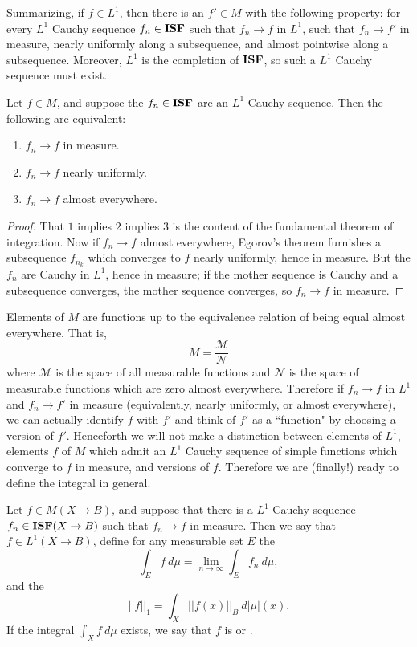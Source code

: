 \begin{subsec}
Summarizing, if $f \in L^1$, then there is an $f' \in M$ with the following property: for every $L^1$ Cauchy sequence $f_n \in \mathbf{ISF}$ such that $f_n \to f$ in $L^1$, such that $f_n \to f'$ in measure, nearly uniformly along a subsequence, and almost pointwise along a subsequence.
Moreover, $L^1$ is the completion of $\mathbf{ISF}$, so such a $L^1$ Cauchy sequence must exist.
\end{subsec}

\begin{corollary}
Let $f \in M$, and suppose the $f_n \in \mathbf{ISF}$ are an $L^1$ Cauchy sequence. Then the following are equivalent:
\begin{enumerate}
\item $f_n \to f$ in measure.
\item $f_n \to f$ nearly uniformly.
\item $f_n \to f$ almost everywhere.
\end{enumerate}
\end{corollary}
\begin{proof}
That $1$ implies $2$ implies $3$ is the content of the fundamental theorem of integration.
Now if $f_n \to f$ almost everywhere, Egorov's theorem furnishes a subsequence $f_{n_k}$ which converges to $f$ nearly uniformly, hence in measure.
But the $f_n$ are Cauchy in $L^1$, hence in measure; if the mother sequence is Cauchy and a subsequence converges, the mother sequence converges, so $f_n \to f$ in measure.
\end{proof}

\begin{subsec}
Elements of $M$ are functions up to the equivalence relation of being equal almost everywhere.
That is,
$$M = \frac{\mathcal M}{\mathcal N}$$
where $\mathcal M$ is the space of all measurable functions and $\mathcal N$ is the space of measurable functions which are zero almost everywhere.
Therefore if $f_n \to f$ in $L^1$ and $f_n \to f'$ in measure (equivalently, nearly uniformly, or almost everywhere), we can actually identify $f$ with $f'$ and think of $f'$ as a ``function" by choosing a version of $f'$.
Henceforth we will not make a distinction between elements of $L^1$, elements $f$ of $M$ which admit an $L^1$ Cauchy sequence of simple functions which converge to $f$ in measure, and versions of $f$.
Therefore we are (finally!) ready to define the integral in general.
\end{subsec}

\begin{definition}
Let $f \in M(X \to B)$, and suppose that there is a $L^1$ Cauchy sequence $f_n \in \mathbf{ISF}(X \to B)$ such that $f_n \to f$ in measure. Then we say that $f \in L^1(X \to B)$, define for any measurable set $E$ the 
$$\int_E f ~d\mu = \lim_{n \to \infty} \int_E f_n~d\mu,$$
and the 
$$||f||_1 = \int_X ||f(x)||_B ~d|\mu|(x).$$
If the integral $\int_X f~d\mu$ exists, we say that $f$ is  or .
\end{definition}

